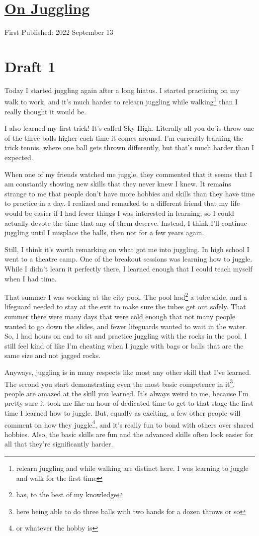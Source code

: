 \documentclass[12pt]{article}[titlepage]
\newcommand{\1}{\={a}}
\newcommand{\2}{\={e}}
\newcommand{\3}{\={\i}}
\newcommand{\4}{\=o}
\newcommand{\5}{\=u}
\newcommand{\6}{\={A}}
\renewcommand{\,}{\textsuperscript{,}}
\begin{document}
\doublespacing
\section{\href{juggling.html}{On Juggling}}
First Published: 2022 September 13
\section{Draft 1}
Today I started juggling again after a long hiatus.
I started practicing on my walk to work, and it's much harder to relearn juggling while walking\footnote{relearn juggling and while walking are distinct here. I was learning to juggle and walk for the first time} than I really thought it would be.

I also learned my first trick!
It's called Sky High.
Literally all you do is throw one of the three balls higher each time it comes around.
I'm currently learning the trick tennis, where one ball gets thrown differently, but that's much harder than I expected.

When one of my friends watched me juggle, they commented that it seems that I am constantly showing new skills that they never knew I knew.
It remains strange to me that people don't have more hobbies and skills than they have time to practice in a day.
I realized and remarked to a different friend that my life would be easier if I had fewer things I was interested in learning, so I could actually devote the time that any of them deserve.
Instead, I think I'll continue juggling until I misplace the balls, then not for a few years again.

Still, I think it's worth remarking on what got me into juggling.
In high school I went to a theatre camp.
One of the breakout sessions was learning how to juggle.
While I didn't learn it perfectly there, I learned enough that I could teach myself when I had time.

That summer I was working at the city pool.
The pool had\footnote{has, to the best of my knowledge} a tube slide, and a lifeguard needed to stay at the exit to make sure the tubes get out safely.
That summer there were many days that were cold enough that not many people wanted to go down the slides, and fewer lifeguards wanted to wait in the water.
So, I had hours on end to sit and practice juggling with the rocks in the pool.
I still feel kind of like I'm cheating when I juggle with bags or balls that are the same size and not jagged rocks.

Anyways, juggling is in many respects like most any other skill that I've learned.
The second you start demonstrating even the most basic competence in it\footnote{here being able to do three balls with two hands for a dozen throws or so}, people are amazed at the skill you learned.
It's always weird to me, because I'm pretty sure it took me like an hour of dedicated time to get to that stage the first time I learned how to juggle.
But, equally as exciting, a few other people will comment on how they juggle\footnote{or whatever the hobby is}, and it's really fun to bond with others over shared hobbies.
Also, the basic skills are fun and the advanced skills often look easier for all that they're significantly harder.
\end{document}
